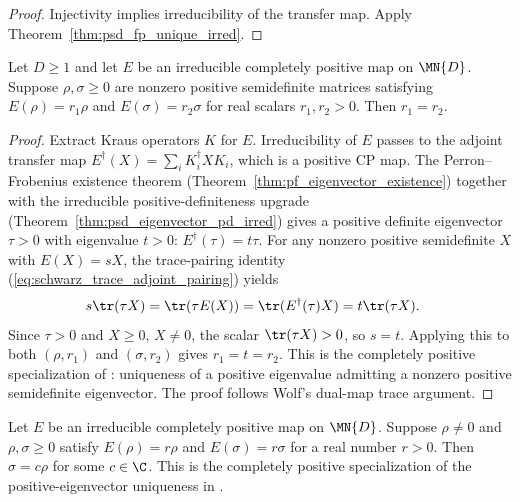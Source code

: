 \begin{proof}\leanok
    Injectivity implies irreducibility of the transfer map. Apply
    Theorem~\ref{thm:psd_fp_unique_irred}.
\end{proof}

\begin{theorem}%
    \label{thm:eigenvalue_unique_irred}
    \leanok
    Let $D \ge 1$ and let $E$ be an irreducible completely positive map
    on $\MN{D}$.
    Suppose $\rho, \sigma \ge 0$ are nonzero positive semidefinite matrices
    satisfying $E(\rho) = r_1\rho$ and $E(\sigma) = r_2\sigma$
    for real scalars $r_1, r_2 > 0$.
    Then $r_1 = r_2$.
\end{theorem}

\begin{proof}
    \leanok
    Extract Kraus operators $K$ for $E$.
    Irreducibility of $E$ passes to the adjoint transfer map
    $E^\dagger(X) = \sum_i K_i^\dagger X K_i$,
    which is a positive CP map.
    The Perron--Frobenius existence theorem
    (Theorem~\ref{thm:pf_eigenvector_existence}) together with the
    irreducible positive-definiteness upgrade
    (Theorem~\ref{thm:psd_eigenvector_pd_irred}) gives a positive definite
    eigenvector $\tau > 0$ with eigenvalue $t > 0$:
    $E^\dagger(\tau) = t\tau$.
    For any nonzero positive semidefinite $X$ with $E(X) = sX$, the
    trace-pairing identity (\ref{eq:schwarz_trace_adjoint_pairing}) yields
    \begin{align}
        s\tr(\tau X)
         & = \tr(\tau E(X))
        = \tr(E^\dagger(\tau)X)
        = t\tr(\tau X).
        \notag
    \end{align}
    Since $\tau > 0$ and $X \ge 0$, $X \neq 0$, the scalar
    $\tr(\tau X) > 0$, so $s = t$.
    Applying this to both $(\rho,r_1)$ and $(\sigma,r_2)$
    gives $r_1 = t = r_2$.
    This is the completely positive specialization of
    \cite[Theorem~6.3(3)]{Wolf2012Quantum}: uniqueness of a positive
    eigenvalue admitting a nonzero positive semidefinite eigenvector.
    The proof follows Wolf's dual-map trace argument.
\end{proof}

\begin{theorem}
    \label{thm:psd_eigenvector_unique_irred}
    \leanok
    Let $E$ be an irreducible completely positive map on $\MN{D}$. Suppose
    $\rho\neq0$ and $\rho,\sigma\geq0$ satisfy
    $E(\rho)=r\rho$ and $E(\sigma)=r\sigma$ for a real number $r>0$.
    Then $\sigma=c\rho$ for some $c\in\C$.
    This is the completely positive specialization of the
    positive-eigenvector uniqueness in
    \cite[Theorem~6.3(2--3)]{Wolf2012Quantum}.
\end{theorem}

